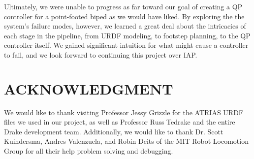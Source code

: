 \documentclass[letterpaper, 10 pt, conference]{ieeeconf}  %
\begin{document}
Ultimately, we were unable to progress as far toward our goal of creating a QP controller for a point-footed biped as we would have liked. By exploring the the system's failure modes, however, we learned a great deal about the intricacies of each stage in the pipeline, from URDF modeling, to footstep planning, to the QP controller itself. We gained significant intuition for what might cause a controller to fail, and we look forward to continuing this project over IAP.

\addtolength{\textheight}{-12cm}   %








\section*{ACKNOWLEDGMENT}

We would like to thank visiting Professor Jessy Grizzle for the ATRIAS URDF files we used in our project, as well as Professor Russ Tedrake and the entire Drake development team. Additionally, we would like to thank Dr. Scott Kuindersma, Andres Valenzuela, and Robin Deits of the MIT Robot Locomotion Group for all their help problem solving and debugging.



\end{document}
